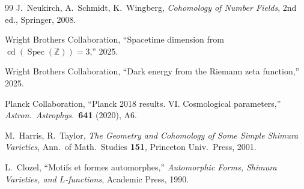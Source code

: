 \documentclass[12pt,a4paper]{article}
\theoremstyle{definition}
\newcommand{\Spec}{\operatorname{Spec}}
\newcommand{\cd}{\operatorname{cd}}
\newcommand{\Z}{\mathbb{Z}}
\begin{document}
\begin{thebibliography}{99}
J.~Neukirch, A.~Schmidt, K.~Wingberg,
\textit{Cohomology of Number Fields}, 2nd ed.,
Springer, 2008.

Wright Brothers Collaboration,
``Spacetime dimension from $\cd(\Spec(\Z))=3$,''
2025.

Wright Brothers Collaboration,
``Dark energy from the Riemann zeta function,''
2025.

Planck Collaboration,
``Planck 2018 results. VI. Cosmological parameters,''
\textit{Astron.\ Astrophys.}\ \textbf{641} (2020), A6.

M.~Harris, R.~Taylor,
\textit{The Geometry and Cohomology of Some Simple Shimura Varieties},
Ann.\ of Math.\ Studies \textbf{151}, Princeton Univ.\ Press, 2001.

L.~Clozel,
``Motifs et formes automorphes,''
\textit{Automorphic Forms, Shimura Varieties, and $L$-functions},
Academic Press, 1990.

\end{thebibliography}
\end{document}
